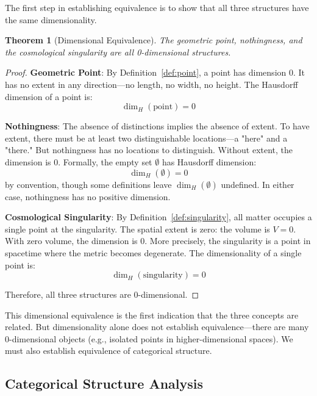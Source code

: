 \documentclass[12pt,a4paper]{article}
\newtheorem{theorem}{Theorem}[section]
\theoremstyle{definition}
\theoremstyle{remark}
\begin{document}
The first step in establishing equivalence is to show that all three structures have the same dimensionality.

\begin{theorem}[Dimensional Equivalence]
\label{thm:dimensional_equiv}
The geometric point, nothingness, and the cosmological singularity are all 0-dimensional structures.
\end{theorem}

\begin{proof}
\textbf{Geometric Point}: By Definition~\ref{def:point}, a point has dimension 0. It has no extent in any direction—no length, no width, no height. The Hausdorff dimension of a point is:
\begin{equation}
\dim_H(\text{point}) = 0
\end{equation}

\textbf{Nothingness}: The absence of distinctions implies the absence of extent. To have extent, there must be at least two distinguishable locations—a "here" and a "there." But nothingness has no locations to distinguish. Without extent, the dimension is 0. Formally, the empty set $\emptyset$ has Hausdorff dimension:
\begin{equation}
\dim_H(\emptyset) = 0
\end{equation}
by convention, though some definitions leave $\dim_H(\emptyset)$ undefined. In either case, nothingness has no positive dimension.

\textbf{Cosmological Singularity}: By Definition~\ref{def:singularity}, all matter occupies a single point at the singularity. The spatial extent is zero: the volume is $V = 0$. With zero volume, the dimension is 0. More precisely, the singularity is a point in spacetime where the metric becomes degenerate. The dimensionality of a single point is:
\begin{equation}
\dim_H(\text{singularity}) = 0
\end{equation}

Therefore, all three structures are 0-dimensional.
\end{proof}

This dimensional equivalence is the first indication that the three concepts are related. But dimensionality alone does not establish equivalence—there are many 0-dimensional objects (e.g., isolated points in higher-dimensional spaces). We must also establish equivalence of categorical structure.

\subsection{Categorical Structure Analysis}
\end{document}

